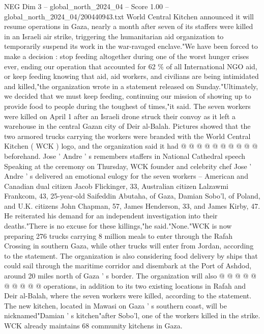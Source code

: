 \begin{textsample}{NEG Dim 3 – global\_north\_2024\_04 – Score 1.00 – global\_north\_2024\_04/200440943.txt}  \label{ex:f3_neg_400}
World Central Kitchen announced it will resume operations in Gaza, nearly a month after seven of its staffers were killed in an Israeli air strike, triggering the humanitarian aid organization to temporarily suspend its work in the war-ravaged enclave."We have been forced to make a decision : stop feeding altogether during one of the worst hunger crises ever, ending our operation that accounted for 62 \% of all International NGO aid, or keep feeding knowing that aid, aid workers, and civilians are being intimidated and killed,"the organization wrote in a statement released on Sunday."Ultimately, we decided that we must keep feeding, continuing our mission of showing up to provide food to people during the toughest of times,"it said.
The seven workers were killed on April 1 after an Israeli drone struck their convoy as it left a warehouse in the central Gazan city of Deir al-Balah.
Pictures showed that the two armored trucks carrying the workers were branded with the World Central Kitchen ( WCK ) logo, and the organization said it had @ @ @ @ @ @ @ @ @ @ beforehand.
Jose ' Andre ' s remembers staffers in National Cathedral speech Speaking at the ceremony on Thursday, WCK founder and celebrity chef Jose ' Andre ' s delivered an emotional eulogy for the seven workers -- American and Canadian dual citizen Jacob Flickinger, 33, Australian citizen Lalzawmi Frankcom, 43, 25-year-old Saifeddin Abutaha, of Gaza, Damian Sobo'l, of Poland, and U.K. citizens John Chapman, 57, James Henderson, 33, and James Kirby, 47.
He reiterated his demand for an independent investigation into their deaths."There is no excuse for these killings,"he said."None."WCK is now preparing 276 trucks carrying 8 million meals to enter through the Rafah Crossing in southern Gaza, while other trucks will enter from Jordan, according to the statement.
The organization is also considering food delivery by ships that could sail through the maritime corridor and disembark at the Port of Ashdod, around 20 miles north of Gaza ' s border.
The organization will also @ @ @ @ @ @ @ @ @ @ operations, in addition to its two existing locations in Rafah and Deir al-Balah, where the seven workers were killed, according to the statement.
The new kitchen, located in Mawasi on Gaza ' s southern coast, will be nicknamed"Damian ' s kitchen"after Sobo'l, one of the workers killed in the strike.
WCK already maintains 68 community kitchens in Gaza.

\end{textsample}
